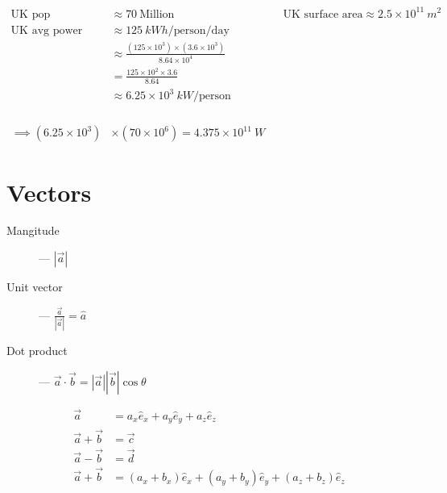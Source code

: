\documentclass[12pt]{article}
\begin{document}
\begin{align*}
	\text{UK pop}               & \approx 70 ~\text{Million}                                                  &  & \text{UK surface area} \approx 2.5 \times 10^{11} ~m^2 \\
	\text{UK avg power}         & \approx 125 ~kWh/\text{person}/\text{day}                                                                                               \\
	                            & \approx \frac{(125 \times 10^3) \times (3.6 \times 10^3)}{8.64 \times 10^4}                                                             \\
	                            & = \frac{125 \times 10^2 \times 3.6}{8.64}                                                                                               \\
	                            & \approx 6.25 \times 10^3 ~kW/\text{person}                                                                                              \\
	\phantom{=}                                                                                                                                                           \\
	\phantom{=}                                                                                                                                                           \\
	\implies (6.25 \times 10^3) & \times (70 \times 10^6) = 4.375 \times 10^{11} ~W
\end{align*}

\section{Vectors}
\begin{description}
	\item[Mangitude] --- $\displaystyle \left|\overrightarrow{a}\right|$
	\item[Unit vector] --- $\displaystyle \frac{\overrightarrow{a}}{\left|\overrightarrow{a}\right|} = \hat{a}$
	\item[Dot product] --- $\displaystyle \overrightarrow{a} \cdot \overrightarrow{b} = |\overrightarrow{a}| |\overrightarrow{b}| \cos{\theta}$
\end{description}

\begin{align*}
	\overrightarrow{a}                      & = a_x \hat{e}_x + a_y \hat{e}_y + a_z \hat{e}_z                         \\
	\overrightarrow{a} + \overrightarrow{b} & = \overrightarrow{c}                                                    \\
	\overrightarrow{a} - \overrightarrow{b} & = \overrightarrow{d}                                                    \\
	\overrightarrow{a} + \overrightarrow{b} & = (a_x + b_x) \hat{e}_x + (a_y + b_y) \hat{e}_y + (a_z + b_z) \hat{e}_z
\end{align*}
\end{document}

